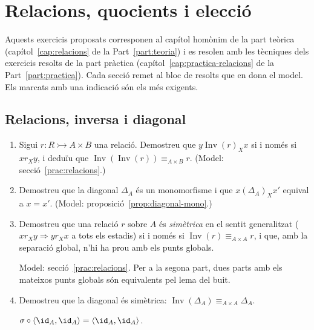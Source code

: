 \chapter{Relacions, quocients i elecció}\label{cap:exercicis-relacions}

Aquests exercicis proposats corresponen al capítol homònim de la part teòrica (capítol~\ref{cap:relacions} de la Part~\ref{part:teoria}) i es resolen amb les tècniques dels exercicis resolts de la part pràctica (capítol~\ref{cap:practica-relacions} de la Part~\ref{part:practica}). Cada secció remet al bloc de resolts que en dona el model. Els marcats amb una indicació són els més exigents.

\section{Relacions, inversa i diagonal}

\begin{enumerate}
  \item Sigui \(r\colon R\rightarrowtail A\times B\) una relació. Demostreu que \(y\mathrel{\operatorname{Inv}(r)_X}x\) si i només si \(x\mathrel{r_X}y\), i deduïu que \(\operatorname{Inv}(\operatorname{Inv}(r))\equiv_{A\times B}r\). (Model: secció~\ref{prac:relacions}.)

  \item Demostreu que la diagonal \(\Delta_A\) és un monomorfisme i que \(x\mathrel{(\Delta_A)_X}x'\) equival a \(x=x'\). (Model: proposició~\ref{prop:diagonal-mono}.)

  \item Demostreu que una relació \(r\) sobre \(A\) és \emph{simètrica} en el sentit generalitzat (\(x\mathrel{r_X}y\Rightarrow y\mathrel{r_X}x\) a tots els estadis) si i només si \(\operatorname{Inv}(r)\equiv_{A\times A}r\), i que, amb la separació global, n'hi ha prou amb els punts globals. \begin{indicacio}Model: secció~\ref{prac:relacions}. Per a la segona part, dues parts amb els mateixos punts globals són equivalents pel lema del buit.\end{indicacio}

  \item Demostreu que la diagonal és simètrica: \(\operatorname{Inv}(\Delta_A)\equiv_{A\times A}\Delta_A\). \begin{indicacio}\(\sigma\circ\langle\id_A,\id_A\rangle=\langle\id_A,\id_A\rangle\).\end{indicacio}
\end{enumerate}

